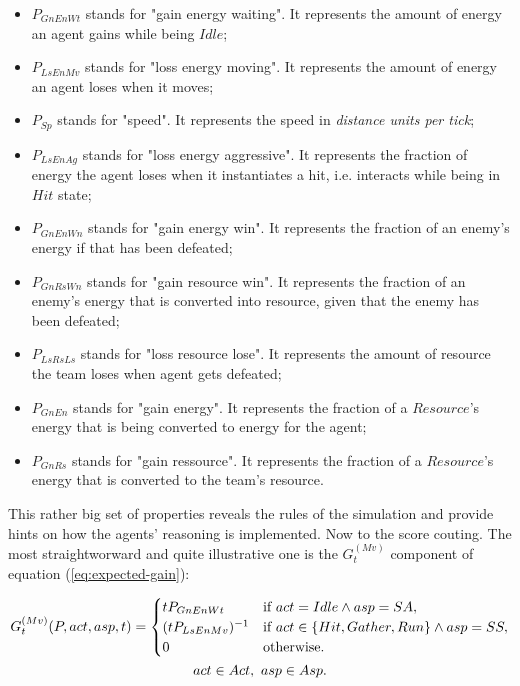 \begin{itemize}
    \item $P_{GnEnWt}$ stands for "gain energy waiting". It represents the amount of energy an agent gains while being $Idle$;
    \item $P_{LsEnMv}$ stands for "loss energy moving". It represents the amount of energy an agent loses when it moves;
    \item $P_{Sp}$ stands for "speed". It represents the speed in \textit{distance units per tick};
    \item $P_{LsEnAg}$ stands for "loss energy aggressive". It represents the fraction of energy the agent loses when it instantiates a hit, i.e. interacts while being in $Hit$ state;
    \item $P_{GnEnWn}$ stands for "gain energy win". It represents the fraction of an enemy's energy if that has been defeated;
    \item $P_{GnRsWn}$ stands for "gain resource win". It represents the fraction of an enemy's energy that is converted into resource, given that the enemy has been defeated;
    \item $P_{LsRsLs}$ stands for "loss resource lose". It represents the amount of resource the team loses when agent gets defeated;
    \item $P_{GnEn}$ stands for "gain energy". It represents the fraction of a $Resource$'s energy that is being converted to energy for the agent;
    \item $P_{GnRs}$ stands for "gain ressource". It represents the fraction of a $Resource$'s energy that is converted to the team's resource.
\end{itemize}

This rather big set of properties reveals the rules of the simulation and provide hints on how the agents' reasoning is
implemented. Now to the score couting. The most straightworward and quite illustrative one is the $G_t^{(Mv)}$ component
of equation (\ref{eq:expected-gain}):

\begin{equation*}
    \begin{gathered}
        $$
        G_t^{(Mv)}(P,act,asp,t) =
        \begin{cases}
            tP_{GnEnWt} & \mbox{if } act=Idle \wedge asp = SA,\\
            ({tP_{LsEnMv}})^{-1} & \mbox{if } act \in \{Hit, Gather, Run\} \wedge asp = SS,\\
            0 & \mbox{otherwise}.
        \end{cases} \\
        act \in Act, \  asp \in Asp.
        $$
    \end{gathered}
\end{equation*}

